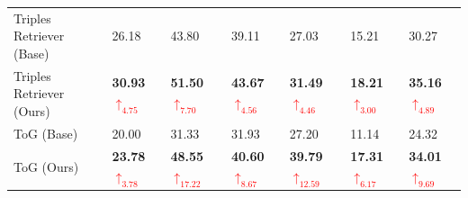 \documentclass[11pt]{article}
\begin{document}
\begin{table}[p]
{\begin{NiceTabular}{@{}l|llllll@{}}
Triples Retriever (Base) & 26.18 & 43.80 & 39.11 & 27.03 & 15.21 & 30.27 \\
Triples Retriever (Ours) & \textbf{30.93}\textcolor{red}{$\uparrow_{4.75}$} & \textbf{51.50}\textcolor{red}{$\uparrow_{7.70}$} & \textbf{43.67}\textcolor{red}{$\uparrow_{4.56}$} & \textbf{31.49}\textcolor{red}{$\uparrow_{4.46}$} & \textbf{18.21}\textcolor{red}{$\uparrow_{3.00}$} & \textbf{35.16}\textcolor{red}{$\uparrow_{4.89}$} \\
ToG (Base) & 20.00 & 31.33 & 31.93 & 27.20 & 11.14 & 24.32 \\
ToG (Ours) & \textbf{23.78}\textcolor{red}{$\uparrow_{3.78}$} & \textbf{48.55}\textcolor{red}{$\uparrow_{17.22}$} & \textbf{40.60}\textcolor{red}{$\uparrow_{8.67}$} & \textbf{39.79}\textcolor{red}{$\uparrow_{12.59}$} & \textbf{17.31}\textcolor{red}{$\uparrow_{6.17}$} & \textbf{34.01}\textcolor{red}{$\uparrow_{9.69}$} \\
\hline
\bottomrule
\end{NiceTabular}}
\label{tab:graph_retrievers_llama}
\end{table}
\end{document}
